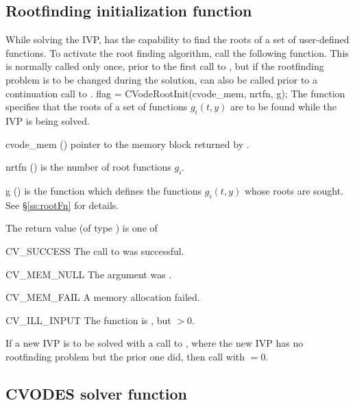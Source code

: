 \subsection{Rootfinding initialization function}\label{ss:cvrootinit}

While solving the IVP, {\cvodes} has the capability to find the
roots of a set of user-defined functions. To activate the root finding 
algorithm, call the following function.  This is normally called only
once, prior to the first call to , but if the rootfinding
problem is to be changed during the solution,  can also
be called prior to a continuation call to . 
{
  flag = CVodeRootInit(cvode\_mem, nrtfn, g);
}
{
  The function  specifies that the roots of a set of
  functions $g_i(t,y)$ are to be found while the IVP is being solved.
}
{
  \begin{args}
  \item[cvode\_mem] ()
    pointer to the {\cvodes} memory block returned by .
  \item[nrtfn] ()
    is the number of root functions $g_i$.
  \item[g] ()
    is the {\CC} function which defines the  functions $g_i(t,y)$
    whose roots are sought. See \S\ref{ss:rootFn} for details.
 \end{args}
}
{
  The return value  (of type ) is one of
  \begin{args}
  \item[CV\_SUCCESS]
    The call to  was successful.
  \item[CV\_MEM\_NULL]
    The  argument was .
  \item[CV\_MEM\_FAIL]
    A memory allocation failed.
  \item[CV\_ILL\_INPUT]
    The function  is , but  $ > 0$.
  \end{args}
}
{
  If a new IVP is to be solved with a call to , where the new
  IVP has no rootfinding problem but the prior one did, then call
   with $=0$.
}


\subsection{CVODES solver function}\label{sss:cvode}

